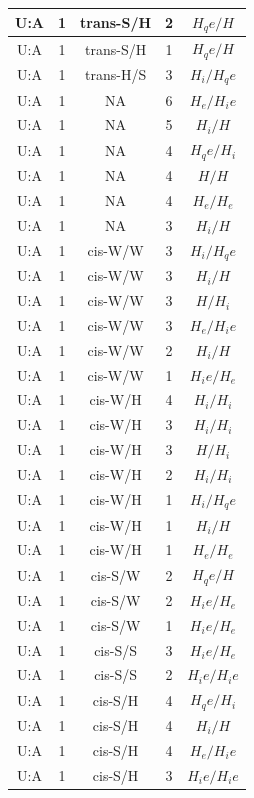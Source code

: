 \begin{center}
\begin{longtable}{c|c|c|c|c}
U:A & 1 & trans-S/H & 2 & $H_qe/H$ \\  \hline
U:A & 1 & trans-S/H & 1 & $H_qe/H$ \\  \hline
U:A & 1 & trans-H/S & 3 & $H_i/H_qe$ \\  \hline
U:A & 1 & NA & 6 & $H_e/H_ie$ \\  \hline
U:A & 1 & NA & 5 & $H_i/H$ \\  \hline
U:A & 1 & NA & 4 & $H_qe/H_i$ \\  \hline
U:A & 1 & NA & 4 & $H/H$ \\  \hline
U:A & 1 & NA & 4 & $H_e/H_e$ \\  \hline
U:A & 1 & NA & 3 & $H_i/H$ \\  \hline
U:A & 1 & cis-W/W & 3 & $H_i/H_qe$ \\  \hline
U:A & 1 & cis-W/W & 3 & $H_i/H$ \\  \hline
U:A & 1 & cis-W/W & 3 & $H/H_i$ \\  \hline
U:A & 1 & cis-W/W & 3 & $H_e/H_ie$ \\  \hline
U:A & 1 & cis-W/W & 2 & $H_i/H$ \\  \hline
U:A & 1 & cis-W/W & 1 & $H_ie/H_e$ \\  \hline
U:A & 1 & cis-W/H & 4 & $H_i/H_i$ \\  \hline
U:A & 1 & cis-W/H & 3 & $H_i/H_i$ \\  \hline
U:A & 1 & cis-W/H & 3 & $H/H_i$ \\  \hline
U:A & 1 & cis-W/H & 2 & $H_i/H_i$ \\  \hline
U:A & 1 & cis-W/H & 1 & $H_i/H_qe$ \\  \hline
U:A & 1 & cis-W/H & 1 & $H_i/H$ \\  \hline
U:A & 1 & cis-W/H & 1 & $H_e/H_e$ \\  \hline
U:A & 1 & cis-S/W & 2 & $H_qe/H$ \\  \hline
U:A & 1 & cis-S/W & 2 & $H_ie/H_e$ \\  \hline
U:A & 1 & cis-S/W & 1 & $H_ie/H_e$ \\  \hline
U:A & 1 & cis-S/S & 3 & $H_ie/H_e$ \\  \hline
U:A & 1 & cis-S/S & 2 & $H_ie/H_ie$ \\  \hline
U:A & 1 & cis-S/H & 4 & $H_qe/H_i$ \\  \hline
U:A & 1 & cis-S/H & 4 & $H_i/H$ \\  \hline
U:A & 1 & cis-S/H & 4 & $H_e/H_ie$ \\  \hline
U:A & 1 & cis-S/H & 3 & $H_ie/H_ie$ \\  \hline

\end{longtable}
\end{center}
